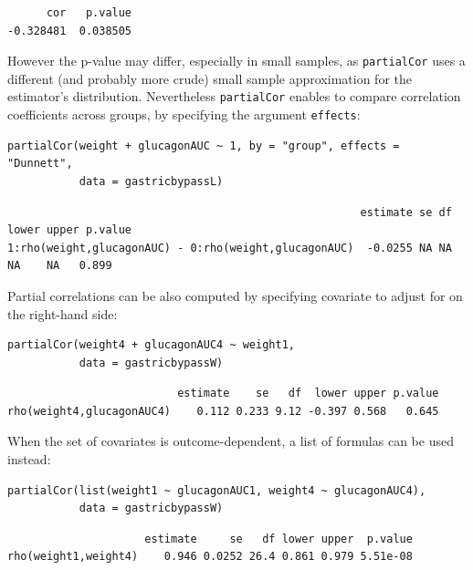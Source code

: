 \documentclass[12pt]{article}
\begin{document}
\begin{verbatim}
      cor   p.value 
-0.328481  0.038505
\end{verbatim}


However the p-value may differ, especially in small samples, as
\texttt{partialCor} uses a different (and probably more crude) small sample
approximation for the estimator's distribution. Nevertheless
\texttt{partialCor} enables to compare correlation coefficients across
groups, by specifying the argument \texttt{effects}:
\lstset{language=r,label= ,caption= ,captionpos=b,numbers=none}
\begin{lstlisting}
partialCor(weight + glucagonAUC ~ 1, by = "group", effects = "Dunnett",
           data = gastricbypassL)
\end{lstlisting}

\begin{verbatim}
                                                      estimate se df lower upper p.value
1:rho(weight,glucagonAUC) - 0:rho(weight,glucagonAUC)  -0.0255 NA NA    NA    NA   0.899
\end{verbatim}



Partial correlations can be also computed by specifying covariate to
adjust for on the right-hand side:
\lstset{language=r,label= ,caption= ,captionpos=b,numbers=none}
\begin{lstlisting}
partialCor(weight4 + glucagonAUC4 ~ weight1,
           data = gastricbypassW)
\end{lstlisting}

\begin{verbatim}
                          estimate    se   df  lower upper p.value
rho(weight4,glucagonAUC4)    0.112 0.233 9.12 -0.397 0.568   0.645
\end{verbatim}


When the set of covariates is outcome-dependent, a list of formulas
can be used instead:
\lstset{language=r,label= ,caption= ,captionpos=b,numbers=none}
\begin{lstlisting}
partialCor(list(weight1 ~ glucagonAUC1, weight4 ~ glucagonAUC4),
           data = gastricbypassW)
\end{lstlisting}

\begin{verbatim}
                     estimate     se   df lower upper  p.value
rho(weight1,weight4)    0.946 0.0252 26.4 0.861 0.979 5.51e-08
\end{verbatim}
\end{document}
